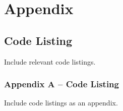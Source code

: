 \chapter{Appendix}

\section{Code Listing}
Include relevant code listings.

\subsection{Appendix A – Code Listing}
Include code listings as an appendix.

